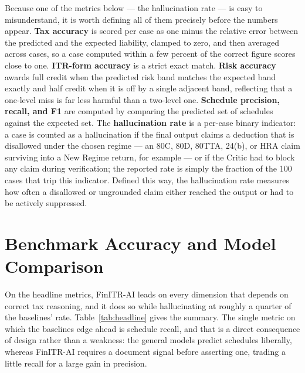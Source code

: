 \documentclass[12pt, a4paper, oneside]{report}
\begin{document}
Because one of the metrics below --- the hallucination rate --- is easy to
misunderstand, it is worth defining all of them precisely before the numbers
appear. \textbf{Tax accuracy} is scored per case as one minus the relative error
between the predicted and the expected liability, clamped to zero, and then
averaged across cases, so a case computed within a few percent of the correct
figure scores close to one. \textbf{ITR-form accuracy} is a strict exact match.
\textbf{Risk accuracy} awards full credit when the predicted risk band matches
the expected band exactly and half credit when it is off by a single adjacent
band, reflecting that a one-level miss is far less harmful than a two-level one.
\textbf{Schedule precision, recall, and F1} are computed by comparing the
predicted set of schedules against the expected set. The \textbf{hallucination
rate} is a per-case binary indicator: a case is counted as a hallucination if the
final output claims a deduction that is disallowed under the chosen regime --- an
80C, 80D, 80TTA, 24(b), or HRA claim surviving into a New Regime return, for
example --- or if the Critic had to block any claim during verification; the
reported rate is simply the fraction of the 100 cases that trip this indicator.
Defined this way, the hallucination rate measures how often a disallowed or
ungrounded claim either reached the output or had to be actively suppressed.

\section{Benchmark Accuracy and Model Comparison}
\label{sec:result-set-1}

On the headline metrics, FinITR-AI leads on every dimension that depends on
correct tax reasoning, and it does so while hallucinating at roughly a quarter
of the baselines' rate. Table~\ref{tab:headline} gives the summary. The single
metric on which the baselines edge ahead is schedule recall, and that is a
direct consequence of design rather than a weakness: the general models predict
schedules liberally, whereas FinITR-AI requires a document signal before
asserting one, trading a little recall for a large gain in precision.
\end{document}
